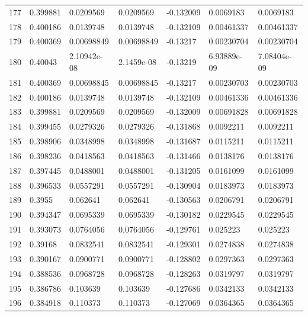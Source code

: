 \begin{longtable}{l|lll|lll}
 177 &  0.399881    & 0.0209569   & 0.0209569   & -0.132009    & 0.0069183   & 0.0069183   \\
 178 &  0.400186    & 0.0139748   & 0.0139748   & -0.132109    & 0.00461337  & 0.00461337  \\
 179 &  0.400369    & 0.00698849  & 0.00698849  & -0.13217     & 0.00230704  & 0.00230704  \\
 180 &  0.40043     & 2.10942e-08 & 2.1459e-08  & -0.13219     & 6.93889e-09 & 7.08404e-09 \\
 181 &  0.400369    & 0.00698845  & 0.00698845  & -0.13217     & 0.00230703  & 0.00230703  \\
 182 &  0.400186    & 0.0139748   & 0.0139748   & -0.132109    & 0.00461336  & 0.00461336  \\
 183 &  0.399881    & 0.0209569   & 0.0209569   & -0.132009    & 0.00691828  & 0.00691828  \\
 184 &  0.399455    & 0.0279326   & 0.0279326   & -0.131868    & 0.0092211   & 0.0092211   \\
 185 &  0.398906    & 0.0348998   & 0.0348998   & -0.131687    & 0.0115211   & 0.0115211   \\
 186 &  0.398236    & 0.0418563   & 0.0418563   & -0.131466    & 0.0138176   & 0.0138176   \\
 187 &  0.397445    & 0.0488001   & 0.0488001   & -0.131205    & 0.0161099   & 0.0161099   \\
 188 &  0.396533    & 0.0557291   & 0.0557291   & -0.130904    & 0.0183973   & 0.0183973   \\
 189 &  0.3955      & 0.062641    & 0.062641    & -0.130563    & 0.0206791   & 0.0206791   \\
 190 &  0.394347    & 0.0695339   & 0.0695339   & -0.130182    & 0.0229545   & 0.0229545   \\
 191 &  0.393073    & 0.0764056   & 0.0764056   & -0.129761    & 0.025223    & 0.025223    \\
 192 &  0.39168     & 0.0832541   & 0.0832541   & -0.129301    & 0.0274838   & 0.0274838   \\
 193 &  0.390167    & 0.0900771   & 0.0900771   & -0.128802    & 0.0297363   & 0.0297363   \\
 194 &  0.388536    & 0.0968728   & 0.0968728   & -0.128263    & 0.0319797   & 0.0319797   \\
 195 &  0.386786    & 0.103639    & 0.103639    & -0.127686    & 0.0342133   & 0.0342133   \\
 196 &  0.384918    & 0.110373    & 0.110373    & -0.127069    & 0.0364365   & 0.0364365   \\

\end{longtable}
